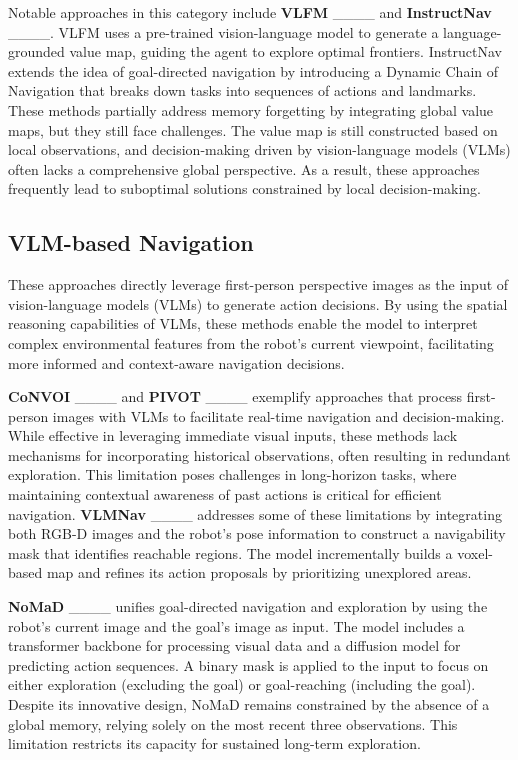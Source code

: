 Notable approaches in this category include 
\textbf{VLFM} ____ and \textbf{InstructNav} ____. VLFM uses a pre-trained vision-language model to generate a language-grounded value map, guiding the agent to explore optimal frontiers. InstructNav extends the idea of goal-directed navigation by introducing a Dynamic Chain of Navigation that breaks down tasks into sequences of actions and landmarks. These methods partially address memory forgetting by integrating global value maps, but they still face challenges. The value map is still constructed based on local observations, and decision-making driven by vision-language models (VLMs) often lacks a comprehensive global perspective. As a result, these approaches frequently lead to suboptimal solutions constrained by local decision-making.

\subsection{VLM-based Navigation}
These approaches directly leverage first-person perspective images as the input of vision-language models (VLMs) to generate action decisions. By using the spatial reasoning capabilities of VLMs, these methods enable the model to interpret complex environmental features from the robot’s current viewpoint, facilitating more informed and context-aware navigation decisions.

\textbf{CoNVOI} ____ and \textbf{PIVOT} ____ exemplify approaches that process first-person images with VLMs to facilitate real-time navigation and decision-making. While effective in leveraging immediate visual inputs, these methods lack mechanisms for incorporating historical observations, often resulting in redundant exploration. This limitation poses challenges in long-horizon tasks, where maintaining contextual awareness of past actions is critical for efficient navigation.
\textbf{VLMNav} ____ addresses some of these limitations by integrating both RGB-D images and the robot’s pose information to construct a navigability mask that identifies reachable regions. The model incrementally builds a voxel-based map and refines its action proposals by prioritizing unexplored areas.

\textbf{NoMaD} ____ unifies goal-directed navigation and exploration by using the robot's current image and the goal's image as input. The model includes a transformer backbone for processing visual data and a diffusion model for predicting action sequences. A binary mask is applied to the input to focus on either exploration (excluding the goal) or goal-reaching (including the goal). Despite its innovative design, NoMaD remains constrained by the absence of a global memory, relying solely on the most recent three observations. This limitation restricts its capacity for sustained long-term exploration.

